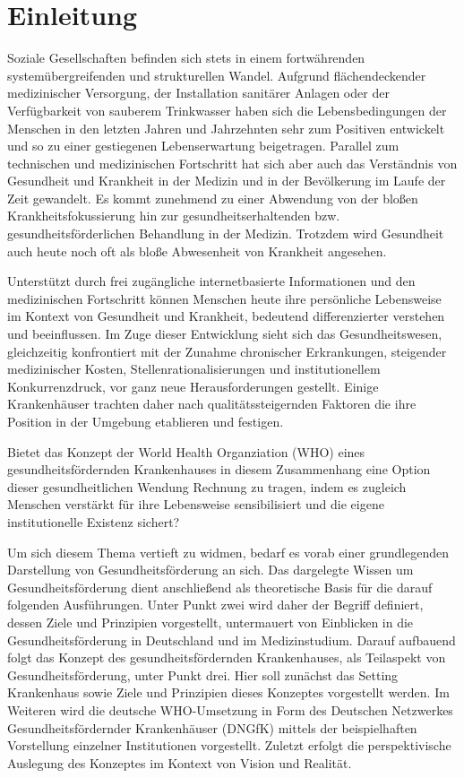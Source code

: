 \section{Einleitung}
\label{sec:Einleitung}

Soziale Gesellschaften befinden sich stets in einem fortwährenden systemübergreifenden
und strukturellen Wandel. Aufgrund flächendeckender medizinischer Versorgung, der Installation sanitärer Anlagen oder der Verfügbarkeit von sauberem Trinkwasser haben sich die Lebensbedingungen der Menschen in den letzten Jahren und Jahrzehnten sehr zum Positiven entwickelt und so zu einer gestiegenen Lebenserwartung beigetragen. Parallel zum technischen und medizinischen Fortschritt hat sich aber auch das Verständnis von Gesundheit und Krankheit in der Medizin und in der Bevölkerung im Laufe der Zeit gewandelt. Es kommt zunehmend zu einer Abwendung von der bloßen Krankheitsfokussierung hin zur gesundheitserhaltenden bzw. gesundheitsförderlichen Behandlung in der Medizin. Trotzdem wird Gesundheit auch heute noch oft als bloße Abwesenheit von Krankheit angesehen.

Unterstützt durch frei zugängliche internetbasierte Informationen und den medizinischen Fortschritt können Menschen heute ihre persönliche Lebensweise im Kontext von Gesundheit und Krankheit, bedeutend differenzierter verstehen und beeinflussen. Im Zuge dieser Entwicklung sieht sich das Gesundheitswesen, gleichzeitig konfrontiert mit der Zunahme chronischer Erkrankungen, steigender medizinischer Kosten, Stellenrationalisierungen und institutionellem Konkurrenzdruck, vor ganz neue Herausforderungen gestellt. Einige Krankenhäuser trachten daher nach qualitätssteigernden Faktoren die ihre Position in der Umgebung etablieren und festigen. 

Bietet das Konzept der World Health Organziation (WHO) eines gesundheitsfördernden Krankenhauses in diesem Zusammenhang eine Option dieser gesundheitlichen Wendung Rechnung zu tragen, indem es zugleich Menschen verstärkt für ihre Lebensweise sensibilisiert und die eigene institutionelle Existenz sichert?

Um sich diesem Thema vertieft zu widmen, bedarf es vorab einer grundlegenden Darstellung von Gesundheitsförderung an sich. Das dargelegte Wissen um Gesundheitsförderung dient anschließend als theoretische Basis für die darauf folgenden Ausführungen. Unter Punkt zwei wird daher der Begriff definiert, dessen Ziele und Prinzipien vorgestellt, untermauert von Einblicken in die Gesundheitsförderung in Deutschland und im Medizinstudium. Darauf aufbauend folgt das Konzept des gesundheitsfördernden Krankenhauses, als Teilaspekt von Gesundheitsförderung, unter Punkt drei. Hier soll zunächst das Setting Krankenhaus sowie Ziele und Prinzipien dieses Konzeptes vorgestellt werden. Im Weiteren wird die deutsche WHO-Umsetzung in Form des Deutschen Netzwerkes Gesundheitsfördernder Krankenhäuser (DNGfK) mittels der beispielhaften Vorstellung einzelner Institutionen vorgestellt. Zuletzt erfolgt die perspektivische Auslegung des Konzeptes im Kontext von  Vision und Realität. 

